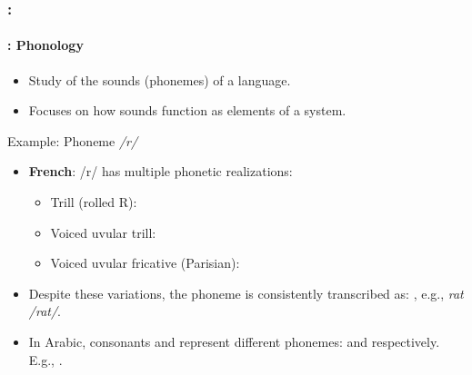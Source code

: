 \documentclass[xcolor=table]{beamer}
\begin{document}
\begin{frame}
	\frametitle{\insertshortsubtitle: \insertsection}
	\framesubtitle{\insertsubsection: Phonology}

	\begin{itemize}
		\item Study of the sounds (phonemes) of a language.
		\item Focuses on how sounds function as elements of a system.
	\end{itemize}
	
	\begin{exampleblock}{Example: Phoneme \textit{/r/}}
		\begin{itemize}
			\item \textbf{French}: /r/ has multiple phonetic realizations:
			\begin{itemize}
				\item Trill (rolled R): \expword{\textipa{[r]}}
				\item Voiced uvular trill: \expword{\textipa{[\;R]}}
				\item Voiced uvular fricative (Parisian): \expword{\textipa{[K]}}
			\end{itemize}
			\item Despite these variations, the phoneme is consistently transcribed as: , e.g., \textit{rat /rat/}.
			
			\item In Arabic, consonants  and  represent different phonemes:  and  respectively. 
			E.g., .
		\end{itemize}
	\end{exampleblock}

\end{frame}
\end{document}
